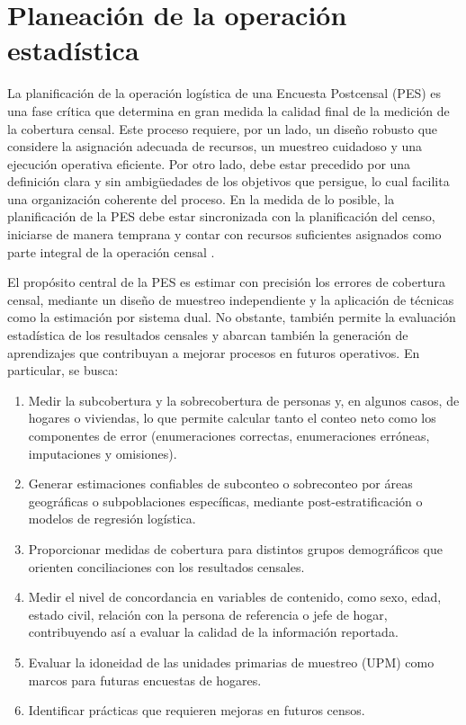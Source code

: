 \documentclass[
  12pt,
]{book}
\begin{document}
\chapter{Planeación de la operación estadística}\label{planeaciuxf3n-de-la-operaciuxf3n-estaduxedstica}

La planificación de la operación logística de una Encuesta Postcensal (PES) es una fase crítica que determina en gran medida la calidad final de la medición de la cobertura censal. Este proceso requiere, por un lado, un diseño robusto que considere la asignación adecuada de recursos, un muestreo cuidadoso y una ejecución operativa eficiente. Por otro lado, debe estar precedido por una definición clara y sin ambigüedades de los objetivos que persigue, lo cual facilita una organización coherente del proceso. En la medida de lo posible, la planificación de la PES debe estar sincronizada con la planificación del censo, iniciarse de manera temprana y contar con recursos suficientes asignados como parte integral de la operación censal \citep{UnitedNations_2010, hogan2003}.

El propósito central de la PES es estimar con precisión los errores de cobertura censal, mediante un diseño de muestreo independiente y la aplicación de técnicas como la estimación por sistema dual. No obstante, también permite la evaluación estadística de los resultados censales y abarcan también la generación de aprendizajes que contribuyan a mejorar procesos en futuros operativos. En particular, se busca:

\begin{enumerate}
\def\labelenumi{\arabic{enumi}.}
\item
  Medir la subcobertura y la sobrecobertura de personas y, en algunos casos, de hogares o viviendas, lo que permite calcular tanto el conteo neto como los componentes de error (enumeraciones correctas, enumeraciones erróneas, imputaciones y omisiones).
\item
  Generar estimaciones confiables de subconteo o sobreconteo por áreas geográficas o subpoblaciones específicas, mediante post-estratificación o modelos de regresión logística.
\item
  Proporcionar medidas de cobertura para distintos grupos demográficos que orienten conciliaciones con los resultados censales.
\item
  Medir el nivel de concordancia en variables de contenido, como sexo, edad, estado civil, relación con la persona de referencia o jefe de hogar, contribuyendo así a evaluar la calidad de la información reportada.
\item
  Evaluar la idoneidad de las unidades primarias de muestreo (UPM) como marcos para futuras encuestas de hogares.
\item
  Identificar prácticas que requieren mejoras en futuros censos.
\end{enumerate}
\end{document}
